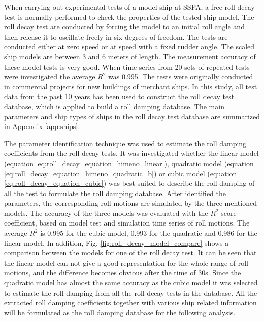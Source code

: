 When carrying out experimental tests of a model ship at SSPA, a free roll decay test is normally performed to check the properties of the tested ship model.
The roll decay test are conducted by forcing the model to an initial roll angle and then release it to oscillate freely in six degrees of freedom. The tests are conducted either  at zero speed or at speed with a fixed rudder angle. The scaled ship models are between 3 and 6 meters of length. The measurement accuracy of these model tests is very good. When time series from 20 sets of repeated tests were investigated the average $R^2$ was 0.995. The tests were originally conducted in commercial projects for new buildings of merchant ships. In this study, all test data from the past 10 years has been used to construct the roll decay test database, which is applied to build a roll damping database. The main parameters and ship types of ships in the roll decay test database are summarized in Appendix \ref{app:ships}. 


The parameter identification technique was used to estimate the roll damping coefficients from the roll decay tests. It was investigated whether the linear model (equation \ref{eq:roll_decay_equation_himeno_linear}), quadratic model (equation \ref{eq:roll_decay_equation_himeno_quadratic_b}) or cubic model (equation \ref{eq:roll_decay_equation_cubic}) was best suited to describe the roll damping of all the test to formulate the roll damping database. After identified the parameters, the corresponding roll motions are simulated by the three mentioned models. The accuracy of the three models was evaluated with the $R^2$ score coefficient, based on model test and simulation time series of roll motions.
The average $R^2$ is 0.995 for the cubic model, 0.993 for the quadratic and 0.986 for the linear model. In addition, Fig. \ref{fig:roll_decay_model_compare} shows a comparison between the models for one of the roll decay test. It can be seen that the linear model can not give a good representation for the whole range of roll motions, and the difference becomes obvious after the time of 30s. Since the quadratic model has almost the same accuracy as the cubic model it was selected to estimate the roll damping from all the roll decay tests in the database. All the extracted roll damping coefficients together with various ship related information will be formulated as the roll damping database for the following analysis.



